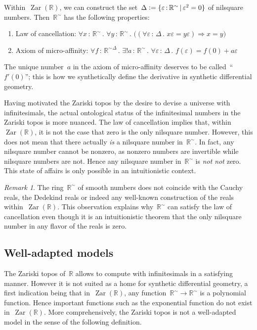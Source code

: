 \documentclass[oneside,reqno]{amsart}
\theoremstyle{definition}
\theoremstyle{plain}
\theoremstyle{remark}
\newtheorem{rem}[defn]{Remark}
\newcommand{\RR}{\mathbb{R}}
\newcommand{\defeq}{\vcentcolon=}
\DeclareMathOperator{\Zar}{Zar}
\renewcommand{\_}{\mathpunct{.}\,}
\newcommand{\?}{\,{:}\,}
\begin{document}
Within~$\Zar(\RR)$, we can construct the set~$\Delta \defeq \{ \varepsilon \? \RR^\sim \,|\,
\varepsilon^2 = 0 \}$ of nilsquare numbers. Then~$\RR^\sim$ has the following properties:
\begin{enumerate}
\item Law of cancellation: $\forall x \? \RR^\sim\_ \forall y \? \RR^\sim\_ \bigl((\forall
\varepsilon \? \Delta\_ x\varepsilon = y\varepsilon)
\Rightarrow x = y\bigr)$
\item Axiom of micro-affinity: $\forall f \? {\RR^\sim}^\Delta\_ \exists! a \? \RR^\sim\_
\forall \varepsilon \? \Delta\_ f(\varepsilon) = f(0) + a\varepsilon$
\end{enumerate}
The unique number~$a$ in the axiom of micro-affinity deserves to be
called~``$f'(0)$''; this is how we synthetically define the derivative in
synthetic differential geometry.

Having motivated the Zariski topos by the desire to devise a universe with
infinitesimals, the actual ontological status of the infinitesimal numbers in
the Zariski topos is more nuanced. The law of cancellation implies that,
within~$\Zar(\RR)$, it is not the case that zero is the only nilsquare number.
However, this does not mean that there actually \emph{is} a nilsquare number
in~$\RR^\sim$. In fact, any nilsquare number cannot be nonzero, as nonzero numbers are
invertible while nilsquare numbers are not. Hence any nilsquare number in~$\RR^\sim$
is \emph{not not} zero. This state of affairs is only possible in an
intuitionistic context.

\begin{rem}The ring~$\RR^\sim$ of smooth numbers does not coincide with the Cauchy reals,
the Dedekind reals or indeed any well-known construction of the reals
within~$\Zar(\RR)$. This observation explains why~$\RR^\sim$ can satisfy the law of
cancellation even though it is an intuitionistic theorem that the only
nilsquare number in any flavor of the reals is zero.
\end{rem}


\subsection{Well-adapted models} The Zariski topos of~$\RR$ allows to compute with
infinitesimals in a satisfying manner. However it is not suited as a home for
synthetic differential geometry, a first indication being that in~$\Zar(\RR)$,
any function~$\RR^\sim \to \RR^\sim$ is a polynomial function. Hence important functions such as the
exponential function do not exist in~$\Zar(\RR)$. More comprehensively, the
Zariski topos is not a well-adapted model in the sense of the following
definition.
\end{document}
